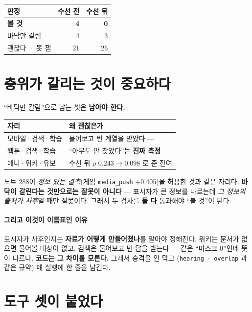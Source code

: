 \documentclass[10pt]{article}
\begin{document}
\begin{center}\small
\begin{tabular}{lrr}
\hline
판정 & 수선 전 & \textbf{수선 뒤} \\
\hline
\textbf{볼 것} & \textbf{4} & \textbf{0} \\
바닥만 갈림 & 4 & 3 \\
괜찮다 · 못 잼 & 21 & 26 \\
\hline
\end{tabular}
\end{center}

\section{층위가 갈리는 것이 중요하다}

``바닥만 갈림''으로 남는 셋은 \textbf{남아야 한다.}

\begin{center}\footnotesize
\begin{tabular}{ll}
\hline
자리 & 왜 괜찮은가 \\
\hline
모바일·검색·학습 & 물어보고 빈 계열을 받았다 --- \\
웹툰·검색·학습 & \quad ``아무도 안 찾았다''는 \textbf{진짜 측정} \\
애니·위키·유보 & 수선 뒤 $\rho$ 0.243$\to$0.098 로 준 잔여 \\
\hline
\end{tabular}
\end{center}

노트 288이 \emph{정보 있는 결측}(게임 \texttt{media\_push} $+$0.405)을
허용한 것과 같은 자리다. \textbf{바닥이 갈린다는 것만으로는 잘못이 아니다}
--- 표시자가 큰 정보를 나르는데 \emph{그 정보의 출처가 사후}일 때만 잘못이다.
그래서 두 검사를 \textbf{둘 다} 통과해야 ``볼 것''이 된다.

\paragraph{그리고 이것이 이름표인 이유} 표시자가 사후인지는 \textbf{자료가
어떻게 만들어졌나}를 알아야 정해진다. 위키는 문서가 없으면 물어볼 대상이
없고, 검색은 물어보고 빈 답을 받는다 --- 같은 ``마스크 0''인데 뜻이 다르다.
\textbf{코드는 그 차이를 모른다.} 그래서 승격을 안 막고
(\texttt{hearing} · \texttt{overlap} 과 같은 규약) 매 실행에 한 줄을 남긴다.

\section{도구 셋이 붙었다}
\end{document}
